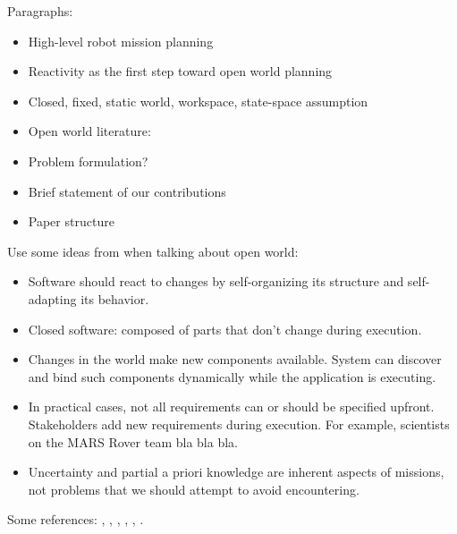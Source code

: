Paragraphs:
\begin{itemize}
	\item High-level robot mission planning
	\item Reactivity as the first step toward open world planning
  	\item Closed, fixed, static world, workspace, state-space assumption
 	\item Open world literature: \cite{MatthiasAI2010}
	\item Problem formulation?
   	\item Brief statement of our contributions
   	\item Paper structure
\end{itemize}

Use some ideas from \cite{open-world-sw} when talking about open world:
\begin{itemize}
	\item Software should react to changes by self-organizing its structure and self-adapting its behavior.
	\item Closed software: composed of parts that don't change during execution.
	\item Changes in the world make new components available. System can discover and bind such components dynamically while the application is executing.
	\item In practical cases, not all requirements can or should be specified upfront. Stakeholders add new requirements during execution. For example, scientists on the MARS Rover team bla bla bla.
	\item Uncertainty and partial a priori knowledge are inherent aspects of missions, not problems that we should attempt to avoid encountering.
\end{itemize}

Some references: \cite{MurrayICRA2012}, \cite{MurrayICRA2013a},  \cite{BeltaICRA2012}, \cite{Dimos2013ICRA}, \cite{Belta2013RSS}, \cite{BingxinRSS2012}.